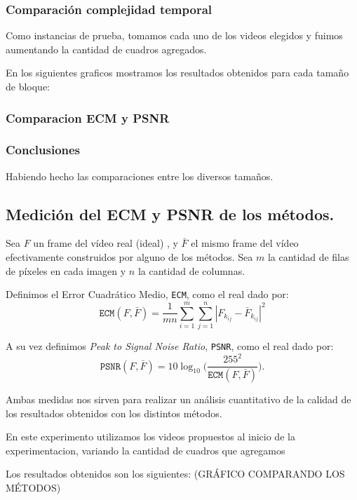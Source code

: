 \subsubsection{Comparación complejidad temporal}
Como instancias de prueba, tomamos cada uno de los videos elegidos y fuimos aumentando la cantidad de cuadros agregados.

En los siguientes graficos mostramos los resultados obtenidos para cada tamaño de bloque:

\subsubsection{Comparacion ECM y PSNR}


\subsubsection{Conclusiones}

Habiendo hecho las comparaciones entre los diversos tamaños.

\subsection{Medición del ECM y PSNR de los métodos.}\label{ECM}
Sea $F$ un frame del vídeo real (ideal) , y $\bar{F}$ el mismo frame del vídeo efectivamente construidos por alguno de los métodos. Sea $m$ la cantidad de filas de píxeles en cada imagen y $n$ la cantidad de columnas.

Definimos el Error Cuadrático Medio, \texttt{ECM}, como el real dado por:
\begin{equation}
\texttt{ECM}(F,\bar{F}) = \frac{1}{mn}\sum_{i=1}^m\sum_{j = 1}^n |F_{k_{ij}} - \bar{F}_{k_{ij}}|^2
\end{equation}

A su vez definimos \emph{Peak to Signal Noise Ratio}, \texttt{PSNR}, como el real dado por:
\begin{equation}
\texttt{PSNR}(F,\bar{F}) = 10 \log_{10}\bigg(\frac{255^2}{\texttt{ECM}(F,\bar{F})}\bigg). \label{eq:psnr}
\end{equation}

Ambas medidas nos sirven para realizar un análisis cuantitativo de la calidad de los resultados obtenidos con los distintos métodos.

En este experimento utilizamos los videos propuestos al inicio de la experimentacion, variando la cantidad de cuadros que agregamos


Los resultados obtenidos son los siguientes: (GRÁFICO COMPARANDO LOS MÉTODOS)

